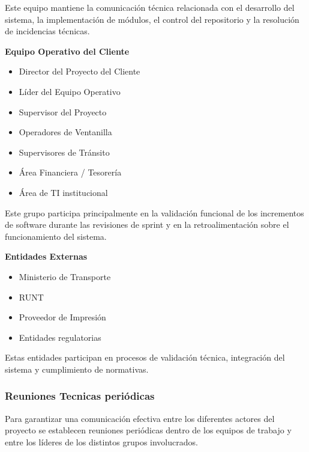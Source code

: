 Este equipo mantiene la comunicación técnica relacionada con el desarrollo del sistema, la implementación de módulos, el control del repositorio y la resolución de incidencias técnicas.

\textbf{Equipo Operativo del Cliente}

\begin{itemize}
\item Director del Proyecto del Cliente
\item Líder del Equipo Operativo
\item Supervisor del Proyecto
\item Operadores de Ventanilla
\item Supervisores de Tránsito
\item Área Financiera / Tesorería
\item Área de TI institucional
\end{itemize}

Este grupo participa principalmente en la validación funcional de los incrementos de software durante las revisiones de sprint y en la retroalimentación sobre el funcionamiento del sistema.

\textbf{Entidades Externas}

\begin{itemize}
\item Ministerio de Transporte
\item RUNT
\item Proveedor de Impresión
\item Entidades regulatorias
\end{itemize}

Estas entidades participan en procesos de validación técnica, integración del sistema y cumplimiento de normativas.

\subsubsection{Reuniones Tecnicas periódicas}

Para garantizar una comunicación efectiva entre los diferentes actores del proyecto se establecen reuniones periódicas dentro de los equipos de trabajo y entre los líderes de los distintos grupos involucrados.

